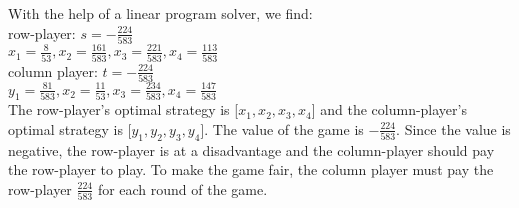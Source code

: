 \documentclass[11pt]{article}
\begin{document}
\begin{enumerate}
With the help of a linear program solver, we find: \\
row-player: $s = -\frac{224}{583}$ \\
$x_1 = \frac{8}{53}, x_2 = \frac{161}{583}, x_3 = \frac{221}{583}, x_4 = \frac{113}{583}$ \\
column player: $t = -\frac{224}{583}$ \\
$y_1 = \frac{81}{583}, x_2 = \frac{11}{53}, x_3 = \frac{234}{583}, x_4 = \frac{147}{583}$ \\
The row-player's optimal strategy is [$x_1,x_2,x_3,x_4$] and the column-player's optimal strategy is [$y_1,y_2,y_3,y_4$]. The value of the game is $-\frac{224}{583}$. Since the value is negative, the row-player is at a disadvantage and the column-player should pay the row-player to play. To make the game fair, the column player must pay the row-player $\frac{224}{583}$ for each round of the game.



\end{enumerate}
\end{document}
